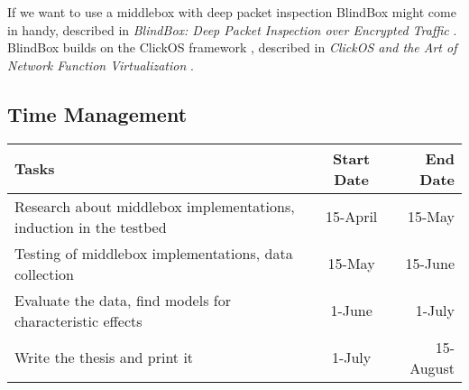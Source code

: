 \documentclass[NET,a4,12pt,ngerman]{netforms}
\begin{document}
If we want to use a middlebox with deep packet inspection BlindBox might come in handy, described in \emph{BlindBox: Deep Packet Inspection
over Encrypted Traffic} \cite{WORK:3}. BlindBox builds on the ClickOS framework , described in \emph{ClickOS and the Art of Network Function Virtualization} \cite{WORK:5}. 


\subsection*{Time Management}
 \begin{tabular}{| l | c | r |}
 	\hline 
 	\textbf{Tasks} & \textbf{Start Date} & \textbf{End Date}  \\ \hline
	Research about middlebox implementations, induction in the testbed & 15-April & 15-May \\ \hline
	Testing of middlebox implementations, data collection & 15-May & 15-June \\ \hline
	Evaluate the data, find models for characteristic effects & 1-June & 1-July \\ \hline
	Write the thesis and print it & 1-July & 15-August \\ 
	\hline
 \end{tabular}




\end{document}

